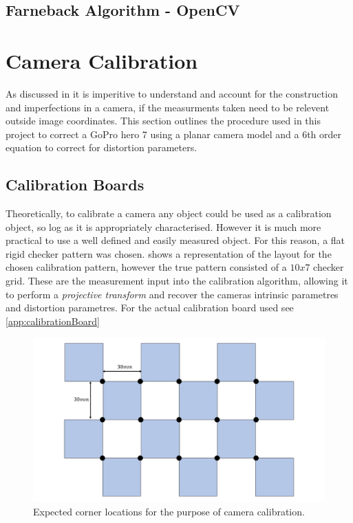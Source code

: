 \documentclass{UoNMCHA}
\numberwithin{equation}{section}
\begin{document}
\subsection{Farneback Algorithm - OpenCV}

\newpage
\section{Camera Calibration}
As discussed in  it is imperitive to understand and account for the construction and imperfections in a camera, if the measurments taken need to be relevent outside image coordinates. This section outlines the procedure used in this project to correct a GoPro hero 7 using a planar camera model and a 6th order equation to correct for distortion parameters.

\subsection{Calibration Boards}\label{sec:CalibrationBoards}
Theoretically, to calibrate a camera any object could be used as a calibration object, so log as it is appropriately characterised. However it is much more practical to use a well defined and easily measured object. For this reason, a flat rigid checker pattern was chosen.  shows a representation of the layout for the chosen calibration pattern, however the true pattern consisted of a $10 x 7$ checker grid. These are the measurement input into the calibration algorithm, allowing it to perform a \textit{projective transform} and recover the cameras intrinsic parametres and distortion parametres. For the actual calibration board used see \cref{app:calibrationBoard}

\begin{figure}[ht]
    \begin{center}
        \includegraphics[width=.8\linewidth]{Figures/CalibCornerLocations}
        \caption{Expected corner locations for the purpose of camera calibration.}
        \label{fig:cornerLocations}
    \end{center}
\end{figure}
\end{document}
